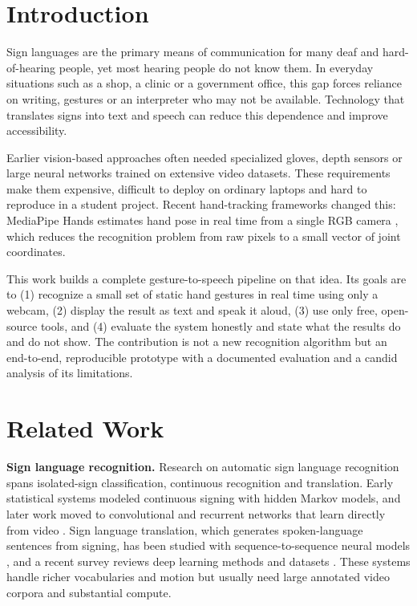 \documentclass[conference]{IEEEtran}
\begin{document}
\section{Introduction}
Sign languages are the primary means of communication for many deaf and hard-of-hearing people, yet most hearing people do not know them. In everyday situations such as a shop, a clinic or a government office, this gap forces reliance on writing, gestures or an interpreter who may not be available. Technology that translates signs into text and speech can reduce this dependence and improve accessibility.

Earlier vision-based approaches often needed specialized gloves, depth sensors or large neural networks trained on extensive video datasets. These requirements make them expensive, difficult to deploy on ordinary laptops and hard to reproduce in a student project. Recent hand-tracking frameworks changed this: MediaPipe Hands estimates hand pose in real time from a single RGB camera \cite{zhang2020}, which reduces the recognition problem from raw pixels to a small vector of joint coordinates.

This work builds a complete gesture-to-speech pipeline on that idea. Its goals are to (1) recognize a small set of static hand gestures in real time using only a webcam, (2) display the result as text and speak it aloud, (3) use only free, open-source tools, and (4) evaluate the system honestly and state what the results do and do not show. The contribution is not a new recognition algorithm but an end-to-end, reproducible prototype with a documented evaluation and a candid analysis of its limitations.

\section{Related Work}
\textbf{Sign language recognition.} Research on automatic sign language recognition spans isolated-sign classification, continuous recognition and translation. Early statistical systems modeled continuous signing with hidden Markov models, and later work moved to convolutional and recurrent networks that learn directly from video \cite{koller2015,pigou2015}. Sign language translation, which generates spoken-language sentences from signing, has been studied with sequence-to-sequence neural models \cite{camgoz2018}, and a recent survey reviews deep learning methods and datasets \cite{rastgoo2021}. These systems handle richer vocabularies and motion but usually need large annotated video corpora and substantial compute.
\end{document}

